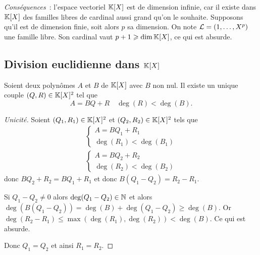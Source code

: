 \emph{Conséquences}~: l'espace vectoriel \(\mathbb{K}[X]\) est de dimension infinie, car
il existe dans \(\mathbb{K}[X]\) des familles libres de cardinal aussi grand qu'on le
souhaite. Supposons qu'il est de dimension finie, soit alors \(p\) sa dimension.
On note \(\mathcal{L} = (1, \ldots, X^p)\) une famille libre. Son cardinal vaut \(p+1
\geqslant \operatorname{dim} \mathbb{K}[X]\), ce qui est absurde.

\subsection{Division euclidienne dans \(\mathbb{K}[X]\)}

\begin{theo}
  Soient deux polynômes \(A\) et \(B\) de \(\mathbb{K}[X]\) avec \(B\) non nul. Il
  existe un unique couple \((Q,R) \in \mathbb{K}[X]^2\) tel que
  \begin{equation}
    A = BQ+R \quad \deg(R) < \deg(B).
  \end{equation}
\end{theo}
\begin{proof}[Unicité]
  Soient \((Q_1,R_1) \in \mathbb{K}[X]^2\) et \((Q_2,R_2) \in \mathbb{K}[X]^2\) tels que
  \begin{align}
    \begin{cases}
      A = BQ_1+R_1 \\ \deg(R_1) < \deg(B_1)
    \end{cases}\\
    \begin{cases}
      A = BQ_2+R_2 \\ \deg(R_2) < \deg(B_2)
    \end{cases}
  \end{align}
  donc \(BQ_2+R_2 = BQ_1+R_1\) et donc \(B(Q_1-Q_2) = R_2-R_1\).

  Si \(Q_1-Q_2 \neq 0\) alors \(\deg(Q_1-Q_2) \in \mathbb{N}\) et alors
  \(\deg(B(Q_1-Q_2)) = \deg(B) + \deg(Q_1-Q_2) \geqslant \deg(B)\). Or
  \(\deg(R_2-R_1) \leqslant \max(\deg(R_1),\deg(R_2)) < \deg(B)\). Ce qui est
  absurde.

  Donc \(Q_1 = Q_2\) et ainsi \(R_1 = R_2\).
\end{proof}
